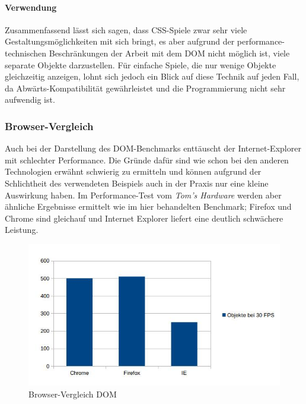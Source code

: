 \documentclass[a4paper, 12pt]{article}
\begin{document}
\paragraph{Verwendung} Zusammenfassend lässt sich sagen, dass CSS-Spiele zwar sehr viele Gestaltungsmöglichkeiten mit sich bringt, es aber aufgrund der performance-technischen Beschränkungen der Arbeit mit dem DOM nicht möglich ist, viele separate Objekte darzustellen. Für einfache Spiele, die nur wenige Objekte gleichzeitig anzeigen, lohnt sich jedoch ein Blick auf diese Technik auf jeden Fall, da Abwärts-Kompatibilität gewährleistet und die Programmierung nicht sehr aufwendig ist.
\subsubsection{Browser-Vergleich} Auch bei der Darstellung des DOM-Benchmarks enttäuscht der Internet-Explorer mit schlechter Performance. Die Gründe dafür sind wie schon bei den anderen Technologien erwähnt schwierig zu ermitteln und können aufgrund der Schlichtheit des verwendeten Beispiels auch in der Praxis nur eine kleine Auswirkung haben. Im Performance-Test vom \emph{Tom's Hardware} werden aber ähnliche Ergebnisse ermittelt wie im hier behandelten Benchmark; Firefox und Chrome sind gleichauf und Internet Explorer liefert eine deutlich schwächere Leistung.\cite{DOMBrowser}
\begin{figure}[H]
	\includegraphics[width=\textwidth]{assets/browser_comp_dom} 
	\caption{Browser-Vergleich DOM}
	\label{browser_comp_dom}
\end{figure}
\newpage
\end{document}

